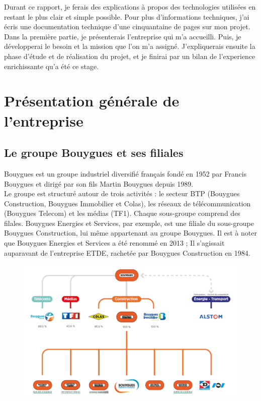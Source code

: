 \documentclass[a4paper]{article}
\begin{document}
    Durant ce rapport, je ferais des explications à propos des technologies utilisées en restant le plus clair et simple possible. Pour plus d'informations techniques, j'ai écris une documentation technique d'une cinquantaine de pages sur mon projet. \\

    Dans la première partie, je présenterais l'entreprise qui m'a accueilli. Puis, je développerai le besoin et la mission que l'on m'a assigné. J'expliquerais ensuite la phase d'étude et de réalisation du projet, et je finirai par un bilan de l'experience enrichissante qu'a été ce stage. \\

    \newpage 
    \section{Présentation générale de l'entreprise}

    \subsection{Le groupe Bouygues et ses filiales}

    Bouygues est un groupe industriel diversifié français fondé en 1952 par Francis Bouygues et dirigé par son fils Martin Bouygues depuis 1989. \\

    Le groupe est structuré autour de trois activités : le secteur BTP (Bouygues Construction,
Bouygues Immobilier et Colas), les réseaux de télécommunication (Bouygues Telecom) et les médias (TF1). Chaque sous-groupe comprend des filales. Bouygues Energies et Services, par exemple, est une filiale du sous-groupe Bouygues Construction, lui même appartenant au groupe Bouygues. Il est à noter que Bouygues Energies et Services a été renommé en 2013 ; Il s'agissait auparavant de l'entreprise ETDE, rachetée par Bouygues Construction en 1984. \\

    \begin{figure}[H]
    \includegraphics[scale=0.45]{img/groupeBouygues}
    \end{figure}
\end{document}
